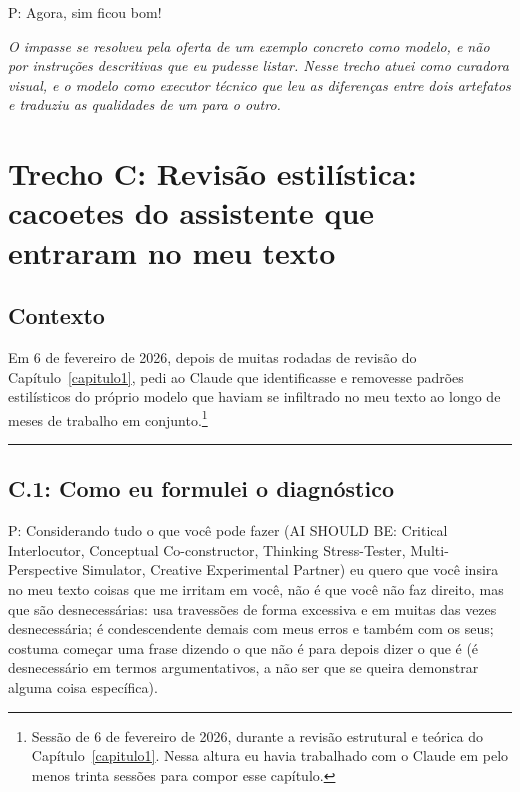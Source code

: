\begin{faladaP}
P: Agora, sim ficou bom!
\end{faladaP}

\noindent\emph{O impasse se resolveu pela oferta de um exemplo concreto como modelo, e não por instruções descritivas que eu pudesse listar. Nesse trecho atuei como curadora visual, e o modelo como executor técnico que leu as diferenças entre dois artefatos e traduziu as qualidades de um para o outro.}


\section*{Trecho C: Revisão estilística: cacoetes do assistente que entraram no meu texto}

\subsection*{Contexto}

Em 6 de fevereiro de 2026, depois de muitas rodadas de revisão do Capítulo~\ref{capitulo1}, pedi ao Claude que identificasse e removesse padrões estilísticos do próprio modelo que haviam se infiltrado no meu texto ao longo de meses de trabalho em conjunto.\footnote{Sessão de 6 de fevereiro de 2026, durante a revisão estrutural e teórica do Capítulo~\ref{capitulo1}. Nessa altura eu havia trabalhado com o Claude em pelo menos trinta sessões para compor esse capítulo.}

\bigskip
\noindent\rule{\textwidth}{0.4pt}
\bigskip

\subsection*{C.1: Como eu formulei o diagnóstico}

\begin{faladaP}
P: Considerando tudo o que você pode fazer (AI SHOULD BE: Critical Interlocutor, Conceptual Co-constructor, Thinking Stress-Tester, Multi-Perspective Simulator, Creative Experimental Partner) eu quero que você insira no meu texto coisas que me irritam em você, não é que você não faz direito, mas que são desnecessárias: usa travessões de forma excessiva e em muitas das vezes desnecessária; é condescendente demais com meus erros e também com os seus; costuma começar uma frase dizendo o que não é para depois dizer o que é (é desnecessário em termos argumentativos, a não ser que se queira demonstrar alguma coisa específica).
\end{faladaP}

